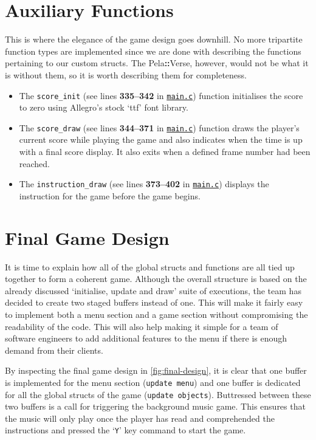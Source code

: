 \documentclass[11pt]{article}
\newcommand{\pelahverse}{Pela\hspace*{1pt}\textbf{::}Verse}
\newcommand{\lineref}[1]{lines \textbf{#1}}
\begin{document}
\section{Auxiliary Functions}

This is where the elegance of the game design goes downhill. No more tripartite function types are implemented since we are done with describing the functions pertaining to our custom structs. The \pelahverse{}, however, would not be what it is without them, so it is worth describing them for completeness. 

\begin{itemize}
    \item The \texttt{score\_init} (see \lineref{335--342} in \hyperref[app:main-c]{\texttt{main.c}}) function initialises the score to zero using Allegro's stock `ttf' font library.
    \item The \texttt{score\_draw} (see \lineref{344--371} in \hyperref[app:main-c]{\texttt{main.c}}) function draws the player's current score while playing the game and also indicates when the time is up with a final score display. It also exits when a defined frame number had been reached. 
    \item The \texttt{instruction\_draw} (see \lineref{373--402} in \hyperref[app:main-c]{\texttt{main.c}}) displays the instruction for the game before the game begins.
\end{itemize}


\section{Final Game Design}

It is time to explain how all of the global structs and functions are all tied up together to form a coherent game. Although the overall structure is based on the already discussed `initialise, update and draw' suite of executions, the team has decided to create two staged buffers instead of one. This will make it fairly easy to implement both a menu section and a game section without compromising the readability of the code. This will also help making it simple for a team of software engineers to add additional features to the menu if there is enough demand from their clients. 

By inspecting the final game design in \autoref{fig:final-design}, it is clear that one buffer is implemented for the menu section (\texttt{update menu}) and one buffer is dedicated for all the global structs of the game (\texttt{update objects}). Buttressed between these two buffers is a call for triggering the background music game. This ensures that the music will only play once the player has read and comprehended the instructions and pressed the `\texttt{Y}' key command to start the game. 
\end{document}
